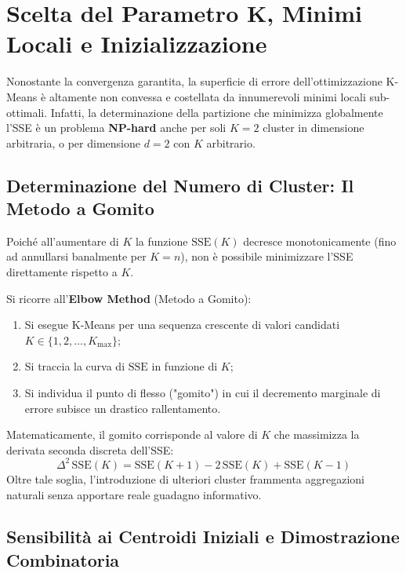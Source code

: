 \section{Scelta del Parametro K, Minimi Locali e Inizializzazione}
\label{sec:dm-kmeans-k-choice-local-minima}

Nonostante la convergenza garantita, la superficie di errore dell'ottimizzazione K-Means è altamente non convessa e costellata da innumerevoli minimi locali sub-ottimali. Infatti, la determinazione della partizione che minimizza globalmente l'SSE è un problema \textbf{NP-hard} anche per soli $K = 2$ cluster in dimensione arbitraria, o per dimensione $d = 2$ con $K$ arbitrario.

\subsection{Determinazione del Numero di Cluster: Il Metodo a Gomito}
\label{sec:dm-kmeans-elbow-method}

Poiché all'aumentare di $K$ la funzione $\mathrm{SSE}(K)$ decresce monotonicamente (fino ad annullarsi banalmente per $K = n$), non è possibile minimizzare l'SSE direttamente rispetto a $K$. 

Si ricorre all'\textbf{Elbow Method} (Metodo a Gomito):
\begin{enumerate}
    \item Si esegue K-Means per una sequenza crescente di valori candidati $K \in \{1, 2, \dots, K_{\max}\}$;
    \item Si traccia la curva di $\mathrm{SSE}$ in funzione di $K$;
    \item Si individua il punto di flesso ("gomito") in cui il decremento marginale di errore subisce un drastico rallentamento.
\end{enumerate}
Matematicamente, il gomito corrisponde al valore di $K$ che massimizza la derivata seconda discreta dell'SSE:
\begin{equation}
    \Delta^2 \, \mathrm{SSE}(K) = \mathrm{SSE}(K+1) - 2 \, \mathrm{SSE}(K) + \mathrm{SSE}(K-1)
\end{equation}
Oltre tale soglia, l'introduzione di ulteriori cluster frammenta aggregazioni naturali senza apportare reale guadagno informativo.

\subsection{Sensibilità ai Centroidi Iniziali e Dimostrazione Combinatoria}

